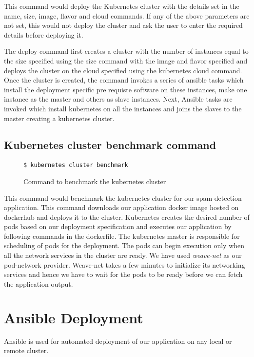 \documentclass[9pt,twocolumn,twoside]{../../styles/osajnl}
\begin{document}
This command would deploy the Kubernetes cluster with the details set
in the name, size, image, flavor and cloud commands. If any of the
above parameters are not set, this would not deploy the cluster and
ask the user to enter the required details before deploying it.

\noindent
The deploy command first creates a cluster with the number of
instances equal to the size specified using the size command with the
image and flavor specified and deploys the cluster on the cloud
specified using the kubernetes cloud command. Once the cluster is
created, the command invokes a series of ansible tasks which install
the deployment specific pre requiste software on these instances, make
one instance as the master and others as slave instances. Next,
Ansible tasks are invoked which install kubernetes on all the
instances and joins the slaves to the master creating a kubernetes
cluster.

\subsection{Kubernetes cluster benchmark command}
\begin{figure}[H]
\begin{verbatim}
$ kubernetes cluster benchmark
\end{verbatim}
\caption{Command to benchmark the kubernetes cluster}
\vspace{-4mm}
\label{Command to benchmark the kubernetes cluster}
\end{figure}

This command would benchmark the kubernetes cluster for our spam
detection application. This command downloads our application docker
image hosted on dockerhub and deploys it to the cluster. Kubernetes
creates the desired number of pods based on our deployment
specification and executes our application by following commands in
the dockerfile. The kubernetes master is responsible for scheduling of
pods for the deployment. The pods can begin execution only when all
the network services in the cluster are ready. We have used
\emph{weave-net} as our pod-network provider. Weave-net takes a few
minutes to initialize its networking services and hence we have to
wait for the pods to be ready before we can fetch the application
output.

\section{Ansible Deployment}
Ansible is used for automated deployment of our application on any
local or remote cluster.
\end{document}
